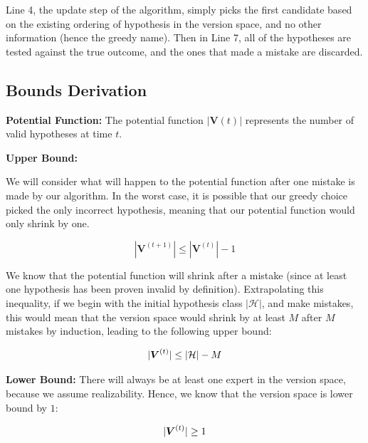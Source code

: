 \documentclass[11pt]{article}
\begin{document}
Line 4, the update step of the algorithm, simply picks the first candidate based on the existing ordering of hypothesis in the version space, and no other information (hence the greedy name). Then in Line 7, all of the hypotheses are tested against the true outcome, and the ones that made a mistake are discarded.

\subsection{Bounds Derivation}



\textbf{Potential Function:
}    
The potential function $|\boldsymbol{V}(t)|$ represents the number of valid hypotheses at time $t$.

\textbf{Upper Bound:}

We will consider what will happen to the potential function after one mistake is made by our algorithm. In the worst case, it is possible that our greedy choice picked the only incorrect hypothesis, meaning that our potential function would only shrink by one. 

$$|\boldsymbol{V}^{(t+1)}| \leq |\boldsymbol{V}^{(t)}| - 1$$

We know that the potential function will shrink after a mistake (since at least one hypothesis has been proven invalid by definition). Extrapolating this inequality, if we begin with the initial hypothesis class $|\mathcal{H}|$, and make mistakes, this would mean that the version space would shrink by at least $M$ after $M$ mistakes by induction, leading to the following upper bound:

\begin{equation}
\centering
|\boldsymbol{V}^{(t)}| \leq |\mathcal{H}| - M
\label{eq:greedy-upper-bound}    
\end{equation}

\textbf{Lower Bound: 
}
There will always be at least one expert in the version space, because we assume realizability. Hence, we know that the version space is lower bound by $1$:

\begin{equation}
\centering
|\boldsymbol{V}^{(t)}| \ge 1
\label{eq:greedy-lower-bound}
\end{equation}
\end{document}
